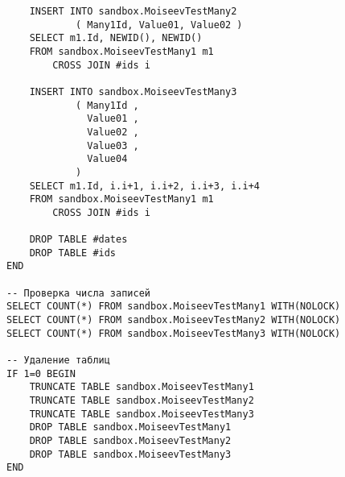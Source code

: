 \begin{lstlisting}
	INSERT INTO sandbox.MoiseevTestMany2
	        ( Many1Id, Value01, Value02 )
	SELECT m1.Id, NEWID(), NEWID()
	FROM sandbox.MoiseevTestMany1 m1
		CROSS JOIN #ids i

	INSERT INTO sandbox.MoiseevTestMany3
	        ( Many1Id ,
	          Value01 ,
	          Value02 ,
	          Value03 ,
	          Value04
	        )
	SELECT m1.Id, i.i+1, i.i+2, i.i+3, i.i+4
	FROM sandbox.MoiseevTestMany1 m1
		CROSS JOIN #ids i

	DROP TABLE #dates
	DROP TABLE #ids
END

-- Проверка числа записей
SELECT COUNT(*) FROM sandbox.MoiseevTestMany1 WITH(NOLOCK)
SELECT COUNT(*) FROM sandbox.MoiseevTestMany2 WITH(NOLOCK)
SELECT COUNT(*) FROM sandbox.MoiseevTestMany3 WITH(NOLOCK)

-- Удаление таблиц
IF 1=0 BEGIN
	TRUNCATE TABLE sandbox.MoiseevTestMany1
	TRUNCATE TABLE sandbox.MoiseevTestMany2
	TRUNCATE TABLE sandbox.MoiseevTestMany3
	DROP TABLE sandbox.MoiseevTestMany1
	DROP TABLE sandbox.MoiseevTestMany2
	DROP TABLE sandbox.MoiseevTestMany3
END
\end{lstlisting}